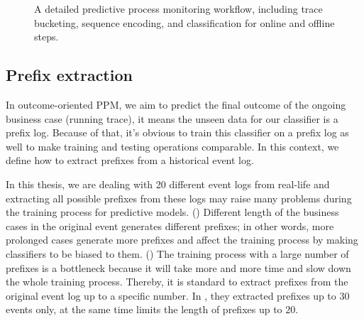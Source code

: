 \begin{figure}[htb]
	\begin{center}
		\caption[Detailed Predictive process monitoring workflow]{A detailed predictive process monitoring workflow, including trace bucketing, sequence encoding, and classification for online and offline steps. }
		\label{fig:ppmwf}
	\end{center}
\end{figure}

\subsection{Prefix extraction}
In outcome-oriented PPM, we aim to predict the final outcome of the ongoing business case (running trace), it means the unseen data for our classifier is a prefix log. Because of that, it’s obvious to train this classifier on a prefix log as well to make training and testing operations comparable.  In this context, we define how to extract prefixes from a historical event log. 

In this thesis, we are dealing with 20 different event logs from real-life and extracting all possible prefixes from these logs may raise many problems during the training process for predictive models. () Different length of the business cases in the original event generates different prefixes; in other words,  more prolonged cases generate more prefixes and affect the training process by making classifiers to be biased to them. () The training process with a large number of prefixes is a bottleneck because it will take more and more time and slow down the whole training process.  Thereby, it is standard to extract prefixes from the original event log up to a specific number.  In \cite{leontjeva2016complex}, they extracted prefixes up to $30$ events only, at the same time \cite{verenich2016complex} limits the length of prefixes up to $20$.

